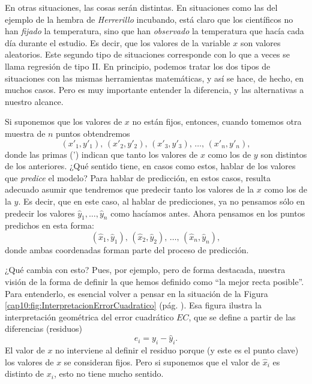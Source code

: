 En otras situaciones, las cosas serán distintas. En situaciones como las del ejemplo de la hembra de {\em Herrerillo} incubando, está claro que los científicos no han {\em fijado} la temperatura, sino que han {\em observado} la temperatura que hacía cada día durante el estudio. Es decir, que los valores de la variable $x$ son valores aleatorios. Este segundo tipo de situaciones corresponde con lo que a veces se llama {\sf regresión de tipo II}. En principio, podemos tratar los dos tipos de situaciones con las mismas herramientas matemáticas, y así se hace, de hecho, en muchos casos. Pero es muy importante entender la diferencia, y las alternativas a nuestro alcance.

Si suponemos que los valores de $x$ no están fijos, entonces, cuando tomemos otra muestra de $n$ puntos obtendremos
\[(x'_1, y'_1),\, (x'_2, y'_2),\, (x'_3, y'_3),\, \ldots,\, (x'_n, y'_n),\]
donde las primas (') indican que tanto los valores de $x$ como los de $y$ son distintos de los anteriores. ¿Qué sentido tiene, en casos como estos, hablar de los valores que {\em predice} el modelo? Para hablar de predicción, en estos casos, resulta adecuado asumir que tendremos que predecir tanto los valores de la $x$ como los de la $y$. Es decir, que en este caso, al hablar de predicciones, ya no pensamos sólo en predecir los valores $\hat y_1, \ldots, \hat y_n$ como hacíamos antes. Ahora pensamos en los puntos predichos en esta  forma:
\begin{equation}
\label{cap10:ecu:ValoresPredichosModeloIIRegresion}
(\hat x_1, \hat y_1),\, (\hat x_2,\hat y_2),\,  \ldots,\, (\hat x_n, \hat y_n),
\end{equation}
donde ambas coordenadas forman parte del proceso de predicción.

¿Qué cambia con esto? Pues, por ejemplo, pero de forma destacada, nuestra visión de la forma de definir la que hemos definido como ``la mejor recta posible''. Para entenderlo, es esencial volver a pensar en la situación de la Figura \ref{cap10:fig:InterpretacionErrorCuadratico} (pág. \pageref{cap10:fig:InterpretacionErrorCuadratico}). Esa figura ilustra la interpretación geométrica del error cuadrático $EC$, que se define a partir de las diferencias (residuos)
\[e_i = y_i - \hat y_i.\]
El valor de $x$ no interviene al definir el residuo porque (y este es el punto clave) los valores de $x$ se consideran fijos. Pero si suponemos que el valor de $\hat x_i$ es distinto de $x_i$, esto no tiene mucho sentido.

